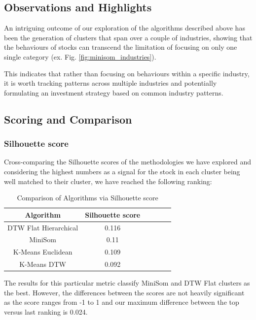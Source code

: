 \documentclass[11pt]{article}
\begin{document}
\subsection{Observations and Highlights}

An intriguing outcome of our exploration of the algorithms described above has been the generation of clusters that span over a couple of industries, showing that the behaviours of stocks can transcend the limitation of focusing on only one single category (ex. Fig. \ref{fig:minisom_industries}).

This indicates that rather than focusing on behaviours within a specific industry, it is worth tracking patterns across multiple industries and potentially formulating an investment strategy based on common industry patterns.  

\subsection{Scoring and Comparison}
\label{sec:compare}

\subsubsection{Silhouette score}

Cross-comparing the Silhouette scores of the methodologies we have explored and considering the highest numbers as a signal for the stock in each cluster being well matched to their cluster, we have reached the following ranking:


\begin{table}[H]
\centering
\begin{tabular}{|c|c|c|c|c|c|}
\hline
\textbf{Algorithm} & \textbf{Silhouette score} \\
\hline
DTW Flat Hierarchical & 0.116 \\
MiniSom & 0.11 \\
K-Means Euclidean & 0.109 \\
K-Means DTW & 0.092\\
\hline
\end{tabular}
\caption{Comparison of Algorithms via Silhouette score}
\label{tab:silhouette_Score}
\end{table}

The results for this particular metric classify MiniSom and DTW Flat clusters as the best. However, the differences between the scores are not heavily significant as the score ranges from -1 to 1 and our maximum difference between the top versus last ranking is 0.024.
\end{document}
